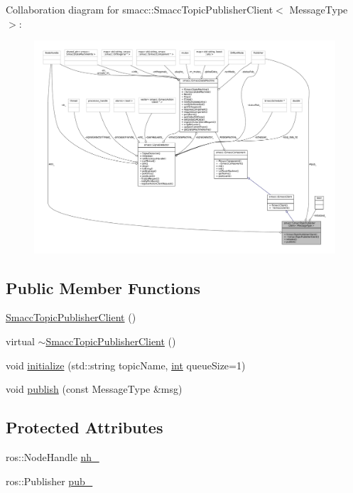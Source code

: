 Collaboration diagram for smacc\+:\+:Smacc\+Topic\+Publisher\+Client$<$ Message\+Type $>$\+:
\nopagebreak
\begin{figure}[H]
\begin{center}
\leavevmode
\includegraphics[width=350pt]{classsmacc_1_1SmaccTopicPublisherClient__coll__graph}
\end{center}
\end{figure}
\subsection*{Public Member Functions}
\begin{DoxyCompactItemize}
\item 
\hyperlink{classsmacc_1_1SmaccTopicPublisherClient_a1e1d04797b5930ba6f4cc6198b2ff3a7}{Smacc\+Topic\+Publisher\+Client} ()
\item 
virtual \hyperlink{classsmacc_1_1SmaccTopicPublisherClient_aab87bffc59484ab72f62966cd76b31e4}{$\sim$\+Smacc\+Topic\+Publisher\+Client} ()
\item 
void \hyperlink{classsmacc_1_1SmaccTopicPublisherClient_a739bc675f476023f4b657a03afd68098}{initialize} (std\+::string topic\+Name, \hyperlink{classint}{int} queue\+Size=1)
\item 
void \hyperlink{classsmacc_1_1SmaccTopicPublisherClient_a8f72ebf2cdb0b56b8288fde14c787c01}{publish} (const Message\+Type \&msg)
\end{DoxyCompactItemize}
\subsection*{Protected Attributes}
\begin{DoxyCompactItemize}
\item 
ros\+::\+Node\+Handle \hyperlink{classsmacc_1_1SmaccTopicPublisherClient_a2b238fd801e0a088ee4a7da76fef1e70}{nh\+\_\+}
\item 
ros\+::\+Publisher \hyperlink{classsmacc_1_1SmaccTopicPublisherClient_a29d9f2055484e74922c65f0c036e1e31}{pub\+\_\+}
\end{DoxyCompactItemize}
